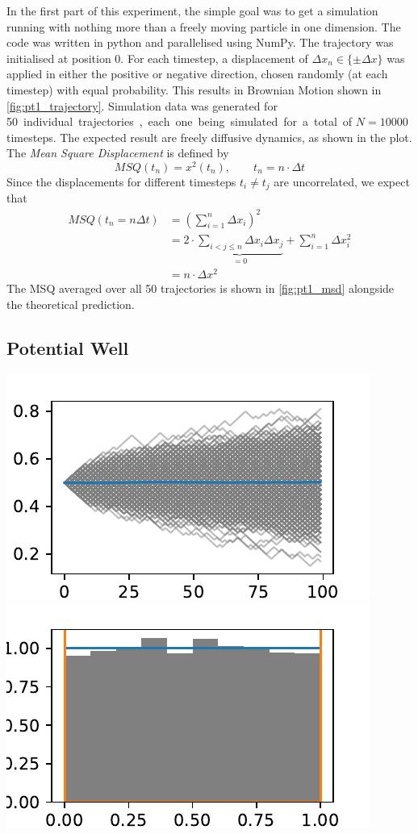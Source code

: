 \documentclass[
    parskip=half, 
    twoside=false,
    twocolumn=true,
    fontsize=11pt,
]{scrarticle}
\begin{document}
In the first part of this experiment, the simple goal was to get a simulation running with nothing more than a freely moving particle in one dimension. The code was written in python and parallelised using NumPy. The trajectory was initialised at position \SI{0}{}. For each timestep, a displacement of $\Delta x_n \in \{\pm \Delta x\}$ was applied in either the positive or negative direction, chosen randomly (at each timestep) with equal probability. This results in Brownian Motion shown in \autoref{fig:pt1_trajectory}. Simulation data was generated for \SI{50} individual trajectories, each one being simulated for a total of $N=\SI{10000}{}$ timesteps. The expected result are freely diffusive dynamics, as shown in the plot. The \textit{Mean Square Displacement} is defined by
\begin{equation}
 MSQ(t_n) = x^2(t_n), \qquad t_n = n \cdot \Delta t
\end{equation}
Since the displacements for different timesteps $t_i\neq t_j$ are uncorrelated, we expect that
\begin{align}
 MSQ(t_n = n \Delta t) &= \left(\sum_{i=1}^n \Delta x_i\right)^2 \\&= 2 \cdot \underbrace{\sum_{i<j\leq n} \Delta x_i \Delta x_j}_{=0} + \sum_{i=1}^n \Delta x_i^2 \\ &= n \cdot \Delta x^2
\end{align}
The MSQ averaged over all \SI{50}{} trajectories is shown in \autoref{fig:pt1_msd} alongside the theoretical prediction.


\subsection{Potential Well}
\includegraphics{figures/02 time evolution.pdf}
\includegraphics{figures/02 histogram.pdf}
\end{document}
